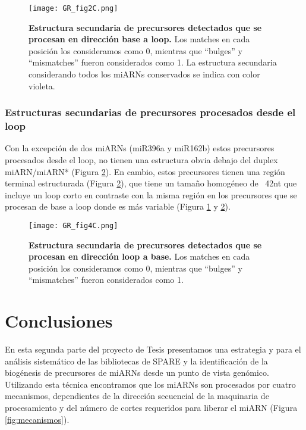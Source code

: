 \begin{figure}[htbp!] 
    \centering    
    \texttt{[image: GR\_fig2C.png]}
    \caption[Estructura secundaria de precursores de base a loop]{
    \textbf{Estructura secundaria de precursores detectados que se procesan en dirección base a loop.}
    Los matches en cada posición los consideramos como 0, mientras que ``bulges'' y ``mismatches'' fueron considerados como 1.
    La estructura secundaria considerando todos los miARNs conservados se indica con color violeta.
    }
    \label{fig:GR_fig2C}
\end{figure}

\subsubsection{Estructuras secundarias de precursores procesados desde el loop}
Con la excepción de dos miARNs (miR396a y miR162b) estos precursores procesados desde el loop, no tienen una estructura obvia debajo del duplex miARN/miARN* (Figura \ref{fig:GR_fig4C}).
En cambio, estos precursores tienen una región terminal estructurada (Figura \ref{fig:GR_fig4C}), que tiene un tamaño homogéneo de ~42nt que incluye un loop corto en contraste con la misma región en los precursores que se procesan de base a loop donde es más variable (Figura \ref{fig:GR_fig2C} y \ref{fig:GR_fig4C}). 

\begin{figure}[htbp!] 
    \centering    
    \texttt{[image: GR\_fig4C.png]}
    \caption[Estructura secundaria de precursores de loop a base]{
   \textbf{ Estructura secundaria de precursores detectados que se procesan en dirección loop a base.}
    Los matches en cada posición los consideramos como 0, mientras que ``bulges'' y ``mismatches'' fueron considerados como 1.}
    \label{fig:GR_fig4C}
\end{figure}


\section{Conclusiones}

En esta segunda parte del proyecto de Tesis presentamos una estrategia y para el análisis sistemático de las bibliotecas de SPARE y la identificación de la biogénesis de precursores de miARNs desde un punto de vista genómico.
Utilizando esta técnica encontramos que los miARNs son procesados por cuatro mecanismos, dependientes de la dirección secuencial de la maquinaria de procesamiento y del número de cortes requeridos para liberar el miARN (Figura \ref{fig:mecanismos}).

